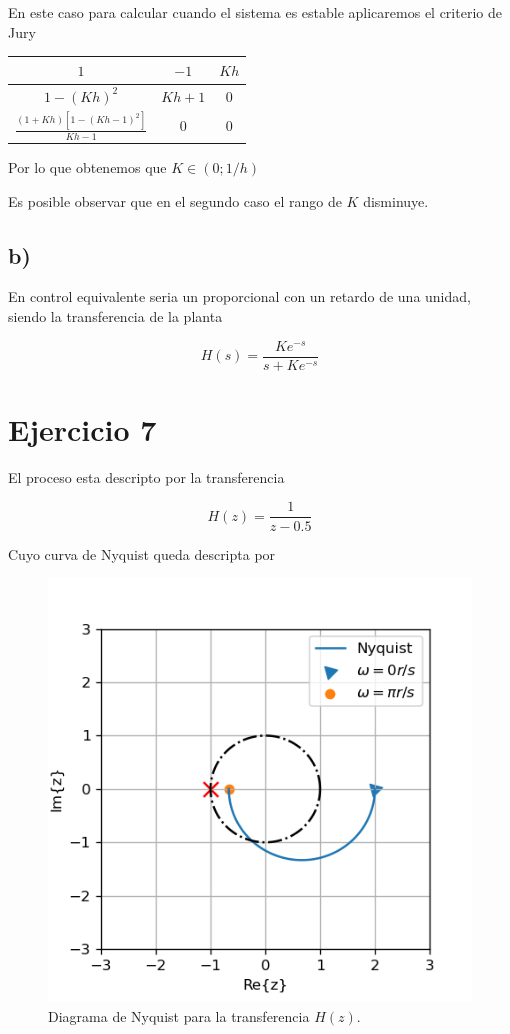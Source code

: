 \documentclass{article}
\begin{document}
                    En este caso para calcular cuando el sistema es estable aplicaremos el criterio de Jury

                    \begin{table}[H]
                        \centering
                        \begin{tabular}{|c|c|c|}
                            \hline $1$ & $-1$ & $Kh$ \\
                            \hline $1-(Kh)^2$ & $Kh+1$ & 0 \\
                            \hline $\frac{(1+Kh)[ 1 - (Kh-1)^2 ]}{Kh-1}$ & 0 & 0\\
                            \hline
                        \end{tabular}
                    \end{table}

                    Por lo que obtenemos que $K \in (0;1/h)$


                Es posible observar que en el segundo caso el rango de $K$ disminuye.

            \subsection{b)}

                En control equivalente seria un proporcional con un retardo de una unidad, siendo la transferencia de la planta 

                \begin{equation}
                    H(s) = \frac{Ke^{-s}}{s + Ke^{-s}}
                \end{equation}

    \section{Ejercicio 7}

            El proceso esta descripto por la transferencia 

            \begin{equation}
                H(z) = \frac{1}{z-0.5}
            \end{equation}

            Cuyo curva de Nyquist queda descripta por 

            \begin{figure}[H]
                \centering
                \includegraphics[width=.4\textwidth]{Img/7.png}
                \caption{Diagrama de Nyquist para la transferencia $H(z)$.}
                \label{}
            \end{figure}
\end{document}
